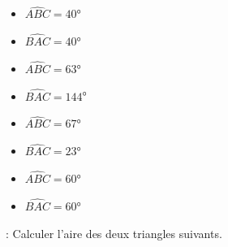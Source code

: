 \begin{minipage}{0.22\textwidth}
    \begin{itemize}
        \item $\widehat{ABC}=40$°
        \item $\widehat{BAC}=40$°
    \end{itemize}
    \begin{center}
        \filling
    \end{center}
\end{minipage}
\hfil
\vrule
\hfil
\begin{minipage}{0.22\textwidth}
    \begin{itemize}
        \item $\widehat{ABC}=63$°
        \item $\widehat{BAC}=144$°
    \end{itemize}
    \begin{center}
        \filling
    \end{center}
\end{minipage}
\hfil
\vrule
\hfil
\begin{minipage}{0.22\textwidth}
    \begin{itemize}
        \item $\widehat{ABC}=67$°
        \item $\widehat{BAC}=23$°
    \end{itemize}
    \begin{center}
        \filling
    \end{center}
\end{minipage}
\hfil
\vrule
\hfil
\begin{minipage}{0.22\textwidth}
    \begin{itemize}
        \item $\widehat{ABC}=60$°
        \item $\widehat{BAC}=60$°
    \end{itemize}
    \begin{center}
        \filling
    \end{center}
\end{minipage}

\newpage

 : Calculer l'aire des deux triangles suivants.

